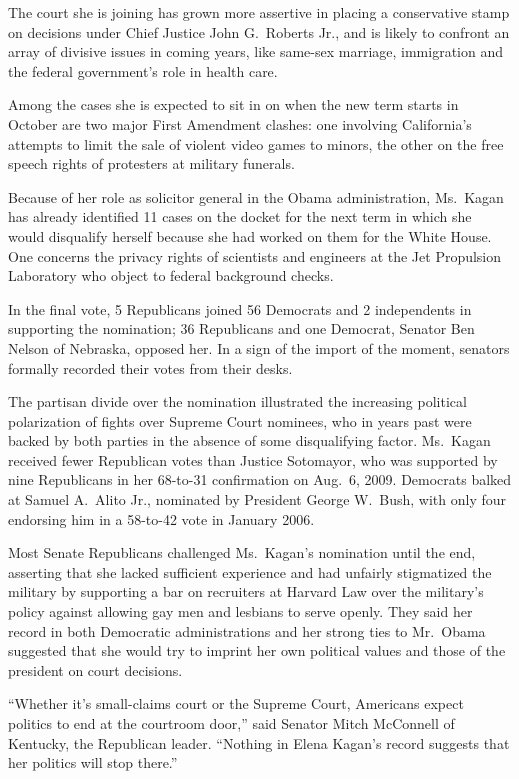 ﻿\documentclass[12pt]{article}
\begin{document}
The court she is joining has grown more assertive in placing a conservative stamp on decisions under
Chief Justice John G.~Roberts Jr., and is likely to confront an array of divisive issues in coming
years, like same-sex marriage, immigration and the federal government's role in health care.

Among the cases she is expected to sit in on when the new term starts in October are two major First
Amendment clashes: one involving California's attempts to limit the sale of violent video games to
minors, the other on the free speech rights of protesters at military funerals.

Because of her role as solicitor general in the Obama administration, Ms.~Kagan has already
identified 11 cases on the docket for the next term in which she would disqualify herself because
she had worked on them for the White House. One concerns the privacy rights of scientists and
engineers at the Jet Propulsion Laboratory who object to federal background checks.

In the final vote, 5 Republicans joined 56 Democrats and 2 independents in supporting the
nomination; 36 Republicans and one Democrat, Senator Ben Nelson of Nebraska, opposed her. In a sign
of the import of the moment, senators formally recorded their votes from their desks.

The partisan divide over the nomination illustrated the increasing political polarization of fights
over Supreme Court nominees, who in years past were backed by both parties in the absence of some
disqualifying factor. Ms.~Kagan received fewer Republican votes than Justice Sotomayor, who was
supported by nine Republicans in her 68-to-31 confirmation on Aug.~6, 2009. Democrats balked at
Samuel A.~Alito Jr., nominated by President George W.~Bush, with only four endorsing him in a
58-to-42 vote in January 2006.

Most Senate Republicans challenged Ms.~Kagan's nomination until the end, asserting that she lacked
sufficient experience and had unfairly stigmatized the military by supporting a bar on recruiters at
Harvard Law over the military's policy against allowing gay men and lesbians to serve openly. They
said her record in both Democratic administrations and her strong ties to Mr.~Obama suggested that
she would try to imprint her own political values and those of the president on court decisions.

``Whether it's small-claims court or the Supreme Court, Americans expect politics to end at the
courtroom door,'' said Senator Mitch McConnell of Kentucky, the Republican leader. ``Nothing in
Elena Kagan's record suggests that her politics will stop there.''
\end{document}
